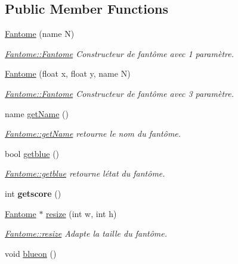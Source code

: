 \subsection*{Public Member Functions}
\begin{DoxyCompactItemize}
\item 
\hyperlink{class_fantome_ad5a64d4dcf429453c95dd01caf6b1d8f}{Fantome} (name N)
\begin{DoxyCompactList}\small\item\em \hyperlink{class_fantome_ad5a64d4dcf429453c95dd01caf6b1d8f}{Fantome\+::\+Fantome} Constructeur de fantôme avec 1 paramètre. \end{DoxyCompactList}\item 
\hyperlink{class_fantome_a4c15b9d4d6ae95d0ef690bab01ec0622}{Fantome} (float x, float y, name N)
\begin{DoxyCompactList}\small\item\em \hyperlink{class_fantome_ad5a64d4dcf429453c95dd01caf6b1d8f}{Fantome\+::\+Fantome} Constructeur de fantôme avec 3 paramètre. \end{DoxyCompactList}\item 
name \hyperlink{class_fantome_a531907b77cb6efebed53a67e0a66a12e}{get\+Name} ()
\begin{DoxyCompactList}\small\item\em \hyperlink{class_fantome_a531907b77cb6efebed53a67e0a66a12e}{Fantome\+::get\+Name} retourne le nom du fantôme. \end{DoxyCompactList}\item 
bool \hyperlink{class_fantome_aae21f40c42450c70d13afeaf08b34b0e}{getblue} ()
\begin{DoxyCompactList}\small\item\em \hyperlink{class_fantome_aae21f40c42450c70d13afeaf08b34b0e}{Fantome\+::getblue} retourne l\textquotesingle{}état du fantôme. \end{DoxyCompactList}\item 
\hypertarget{class_fantome_a7d1f1bcde2c2f58f2f28a99c9b2c0d47}{}int {\bfseries getscore} ()\label{class_fantome_a7d1f1bcde2c2f58f2f28a99c9b2c0d47}

\item 
\hyperlink{class_fantome}{Fantome} $\ast$ \hyperlink{class_fantome_aeed02df3c2f8a8942f88120a2722aabe}{resize} (int w, int h)
\begin{DoxyCompactList}\small\item\em \hyperlink{class_fantome_aeed02df3c2f8a8942f88120a2722aabe}{Fantome\+::resize} Adapte la taille du fantôme. \end{DoxyCompactList}\item 
\hypertarget{class_fantome_aac96b15f234873e7b18f0d9b1fe62d63}{}void \hyperlink{class_fantome_aac96b15f234873e7b18f0d9b1fe62d63}{blueon} ()\label{class_fantome_aac96b15f234873e7b18f0d9b1fe62d63}


\end{DoxyCompactItemize}
